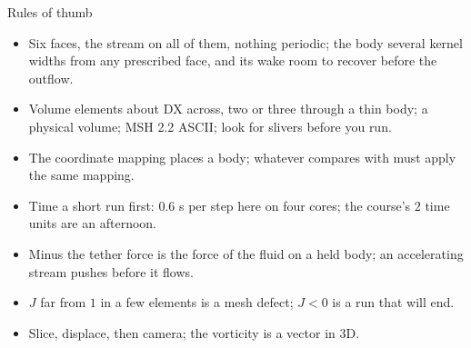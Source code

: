 \documentclass[aspectratio=169,11pt]{beamer}
\begin{document}
\begin{frame}{Rules of thumb}
\label{fr:thumb}
\small
\begin{itemize}
  \item Six faces, the stream on all of them, nothing periodic; the body several kernel widths from any prescribed face, and its wake room to recover before the outflow.
  \item Volume elements about $\mathrm{DX}$ across, two or three through a thin body; a physical volume; MSH 2.2 ASCII; look for slivers before you run.
  \item The coordinate mapping places a body; whatever compares  with  must apply the same mapping.
  \item Time a short run first: $0.6$ s per step here on four cores; the course's $2$ time units are an afternoon.
  \item Minus the tether force is the force of the fluid on a held body; an accelerating stream pushes before it flows.
  \item $J$ far from $1$ in a few elements is a mesh defect; $J < 0$ is a run that will end.
  \item Slice, displace, then camera; the vorticity is a vector in 3D.
\end{itemize}
\end{frame}
\end{document}
